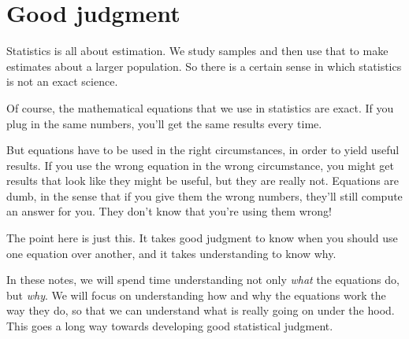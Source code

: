 \documentclass[../../main.tex]{subfiles}
\begin{document}
\section{Good judgment}

Statistics is all about estimation. We study samples and then use that to make estimates about a larger population. So there is a certain sense in which statistics is not an exact science.

Of course, the mathematical equations that we use in statistics are exact. If you plug in the same numbers, you'll get the same results every time. 

But equations have to be used in the right circumstances, in order to yield useful results. If you use the wrong equation in the wrong circumstance, you might get results that look like they might be useful, but they are really not. Equations are dumb, in the sense that if you give them the wrong numbers, they'll still compute an answer for you. They don't know that you're using them wrong! 

The point here is just this. It takes good judgment to know when you should use one equation over another, and it takes understanding to know why.

In these notes, we will spend time understanding not only \emph{what} the equations do, but \emph{why}. We will focus on understanding how and why the equations work the way they do, so that we can understand what is really going on under the hood. This goes a long way towards developing good statistical judgment.
\end{document}
